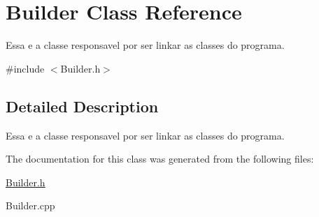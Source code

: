 \hypertarget{class_builder}{\section{Builder Class Reference}
\label{class_builder}
}


Essa e a classe responsavel por ser linkar as classes do programa.  




{\ttfamily \#include $<$Builder.\-h$>$}



\subsection{Detailed Description}
Essa e a classe responsavel por ser linkar as classes do programa. 

The documentation for this class was generated from the following files\-:\begin{DoxyCompactItemize}
\item 
\hyperlink{_builder_8h}{Builder.\-h}\item 
Builder.\-cpp\end{DoxyCompactItemize}

